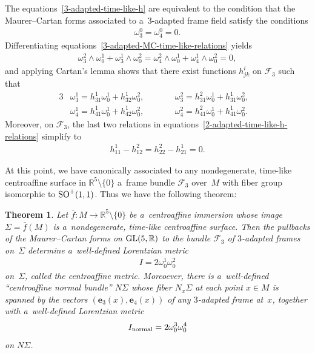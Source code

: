 \documentclass[pdftex]{sigma}
\numberwithin{equation}{section}
\newtheorem{teo}{Theorem}[section]
\theoremstyle{definition}
\begin{document}
The equations~\eqref{3-adapted-time-like-h} are equivalent to the condition that the Maurer--Cartan forms associated to
a~3-adapted frame f\/ield satisfy the conditions
\begin{gather}
\omega^0_3 = \omega^0_4 = 0.
\label{3-adapted-MC-time-like-relations}
\end{gather}
Dif\/ferentiating equations~\eqref{3-adapted-MC-time-like-relations} yields
\begin{gather*}
\omega^2_3 \wedge \omega^1_0 + \omega^1_3 \wedge \omega^2_0 = \omega^2_4 \wedge \omega^1_0 + \omega^1_4 \wedge
\omega^2_0 = 0,
\end{gather*}
and applying Cartan's lemma shows that there exist functions $h^i_{jk}$ on $\mathcal{F}_3$ such that
\begin{alignat*}{3}
& \omega^1_3=h^1_{31}\omega^1_0 + h^1_{32}\omega^2_0,
\qquad&&
\omega^2_3=h^2_{31}\omega^1_0 + h^1_{31}\omega^2_0,&
\\
& \omega^1_4=h^1_{41}\omega^1_0 + h^1_{42}\omega^2_0,
\qquad&&
\omega^2_4=h^2_{41}\omega^1_0 + h^1_{41}\omega^2_0.&
\end{alignat*}
Moreover, on $\mathcal{F}_3$, the last two relations in equations~\eqref{2-adapted-time-like-h-relations} simplify to
\begin{gather*}
h^1_{11} - h^2_{12} = h^2_{22} - h^1_{21} = 0.
\end{gather*}

At this point, we have canonically associated to any nondegenerate, time-like centroaf\/f\/ine surface in $\mathbb{R}^5
\setminus \{0\}$ a~frame bundle $\mathcal{F}_3$ over~$M$ with f\/iber group isomorphic to ${\rm SO}^+(1,1)$.
Thus we have the following theorem:

\begin{teo}
\label{time-like-thm}
Let $\bar{f}:M \to \mathbb{R}^5 \setminus\{0\}$ be a~centroaffine immersion whose image $\Sigma = \bar{f}(M)$ is
a~nondegenerate, time-like centroaffine surface.
Then the pullbacks of the Maurer--Cartan forms on ${\rm GL}(5,\mathbb{R})$ to the bundle $\mathcal{F}_3$ of $3$-adapted
frames on~$\Sigma$ determine a~well-defined Lorentzian metric
\begin{gather*}
I = 2   \omega^1_0  \omega^2_0
\end{gather*}
on~$\Sigma$, called the   centroaffine metric.
Moreoever, there is a~well-defined ``centroaffine normal bundle'' $N\Sigma$ whose fiber $N_x\Sigma$ at each point $x \in M$
is spanned by the vectors $(\mathbf{e}_3(x), \mathbf{e}_4(x))$ of any $3$-adapted frame at~$x$, together with a~well-defined Lorentzian metric
\begin{gather*}
I_{\rm normal} = 2\omega^3_0 \omega^4_0
\end{gather*}
on $N\Sigma$.
\end{teo}
\end{document}
